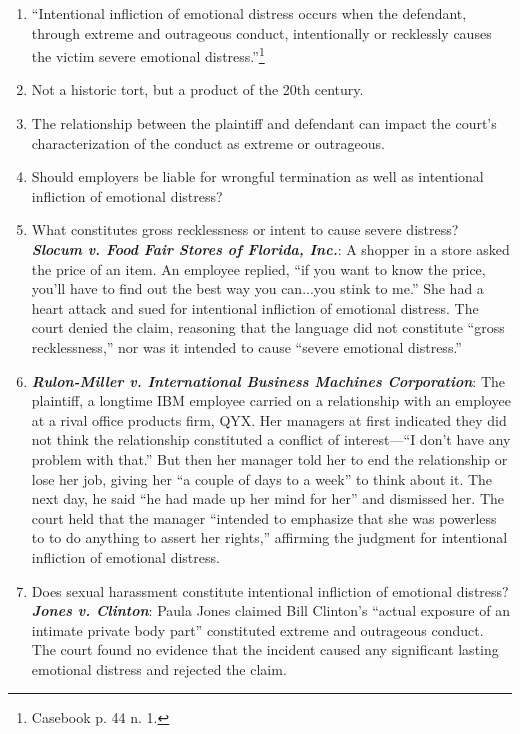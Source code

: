 \begin{enumerate}
    \item ``Intentional infliction of emotional distress occurs when the defendant, through extreme and outrageous conduct, intentionally or recklessly causes the victim severe emotional distress.''\footnote{Casebook p. 44 n. 1.}
    \item Not a historic tort, but a product of the 20th century.
    \item The relationship between the plaintiff and defendant can impact the court's characterization of the conduct as extreme or outrageous.
    \item Should employers be liable for wrongful termination as well as intentional infliction of emotional distress?
    \item What constitutes gross recklessness or intent to cause severe distress? \textbf{\emph{Slocum v. Food Fair Stores of Florida, Inc.}}: A shopper in a store asked the price of an item. An employee replied, ``if you want to know the price, you'll have to find out the best way you can...you stink to me.'' She had a heart attack and sued for intentional infliction of emotional distress. The court denied the claim, reasoning that the language did not constitute ``gross recklessness,'' nor was it intended to cause ``severe emotional distress.''
    \item \textbf{\emph{Rulon-Miller v. International Business Machines Corporation}}: The plaintiff, a longtime IBM employee carried on a relationship with an employee at a rival office products firm, QYX. Her managers at first indicated they did not think the relationship constituted a conflict of interest---``I don't have any problem with that.'' But then her manager told her to end the relationship or lose her job, giving her ``a couple of days to a week'' to think about it. The next day, he said ``he had made up her mind for her'' and dismissed her. The court held that the manager ``intended to emphasize that she was powerless to to do anything to assert her rights,'' affirming the judgment for intentional infliction of emotional distress.
    \item Does sexual harassment constitute intentional infliction of emotional distress? \textbf{\emph{Jones v. Clinton}}: Paula Jones claimed Bill Clinton's ``actual exposure of an intimate private body part'' constituted extreme and outrageous conduct. The court found no evidence that the incident caused any significant lasting emotional distress and rejected the claim.
    
\end{enumerate}

